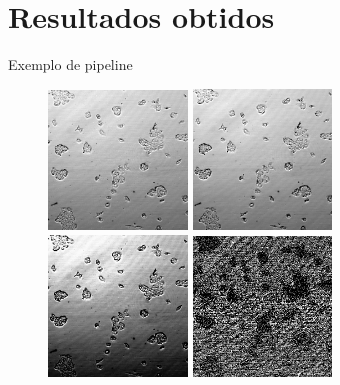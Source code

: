 \documentclass{beamer}
\begin{document}
\section{Resultados obtidos}
\begin{frame}{Exemplo de pipeline}
  \begin{figure}
      \includegraphics[width=0.33\textwidth]{imgs/fototif.png}
      \includegraphics[width=0.33\textwidth]{imgs/mediana.png}
      \includegraphics[width=0.33\textwidth]{imgs/contraste.png}
      \includegraphics[width=0.33\textwidth]{imgs/bordas.png}
    \end{figure}

  \end{frame}
\end{document}
